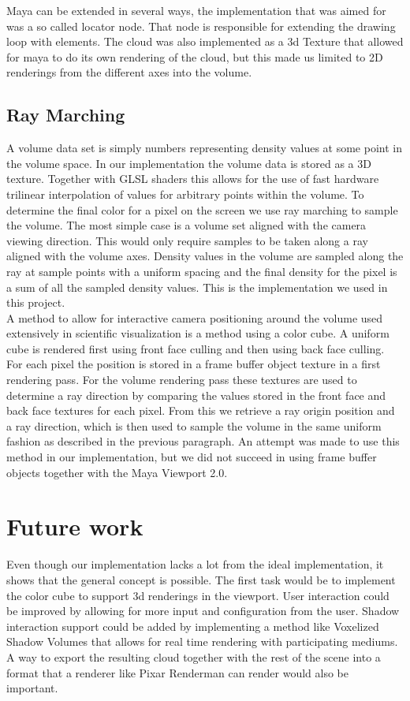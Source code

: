\documentclass[11pt,twocolumn]{article}
\begin{document}
Maya can be extended in several ways, the implementation that was aimed for was a so called locator node.
That node is responsible for extending the drawing loop with elements.
The cloud was also implemented as a 3d Texture that allowed for maya to do its own rendering of the cloud, but this made us limited to 2D renderings from the different axes into the volume.

\subsection{Ray Marching}
A volume data set is simply numbers representing density values at some point in the volume space.
In our implementation the volume data is stored as a 3D texture.
Together with GLSL shaders this allows for the use of fast hardware trilinear interpolation of values for arbitrary points within the volume. To determine the final color for a pixel on the screen we use ray marching to sample the volume.
The most simple case is a volume set aligned with the camera viewing direction.
This would only require samples to be taken along a ray aligned with the volume axes.
Density values in the volume are sampled along the ray at sample points with a uniform spacing and the final density for the pixel is a sum of all the sampled density values.
This is the implementation we used in this project.
\\

A method to allow for interactive camera positioning around the volume used extensively in scientific visualization is a method using a color cube.
A uniform cube is rendered first using front face culling and then using back face culling.
For each pixel the position is stored in a frame buffer object texture in a first rendering pass.
For the volume rendering pass these textures are used to determine a ray direction by comparing the values stored in the front face and back face textures for each pixel. From this we retrieve a ray origin position and a ray direction, which is then used to sample the volume in the same uniform fashion as described in the previous paragraph. An attempt was made to use this method in our implementation, but we did not succeed in using frame buffer objects together with the Maya Viewport 2.0.


\section{Future work}
Even though our implementation lacks a lot from the ideal implementation, it shows that the general concept is possible.
The first task would be to implement the color cube to support 3d renderings in the viewport.
User interaction could be improved by allowing for more input and configuration from the user.
Shadow interaction support could be added by implementing a method like Voxelized Shadow Volumes that allows for real time rendering with participating mediums.
A way to export the resulting cloud together with the rest of the scene into a format that a renderer like Pixar Renderman can render would also be important.
\end{document}
